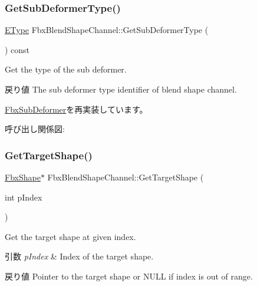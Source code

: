 \subsubsection{\texorpdfstring{Get\+Sub\+Deformer\+Type()}{GetSubDeformerType()}}
{\footnotesize\ttfamily \hyperlink{class_fbx_sub_deformer_aed7eba8aabbb8b25a8ddbab127d67319}{E\+Type} Fbx\+Blend\+Shape\+Channel\+::\+Get\+Sub\+Deformer\+Type (\begin{DoxyParamCaption}{ }\end{DoxyParamCaption}) const\hspace{0.3cm}{\ttfamily [virtual]}}

Get the type of the sub deformer. \begin{DoxyReturn}{戻り値}
The sub deformer type identifier of blend shape channel. 
\end{DoxyReturn}


\hyperlink{class_fbx_sub_deformer_a1a1998b98ca03598bc6bec630e1aaa97}{Fbx\+Sub\+Deformer}を再実装しています。

呼び出し関係図\+:
\mbox{\label{class_fbx_blend_shape_channel_a50cdc8d0c76e13c093453efca50484a6}} 
\subsubsection{\texorpdfstring{Get\+Target\+Shape()}{GetTargetShape()}\hspace{0.1cm}{\footnotesize\ttfamily [1/2]}}
{\footnotesize\ttfamily \hyperlink{class_fbx_shape}{Fbx\+Shape}$\ast$ Fbx\+Blend\+Shape\+Channel\+::\+Get\+Target\+Shape (\begin{DoxyParamCaption}\item[{int}]{p\+Index }\end{DoxyParamCaption})}

Get the target shape at given index. 
\begin{DoxyParams}{引数}
{\em p\+Index} & Index of the target shape. \\
\hline
\end{DoxyParams}
\begin{DoxyReturn}{戻り値}
Pointer to the target shape or {\ttfamily N\+U\+LL} if index is out of range. 
\end{DoxyReturn}
\mbox{\label{class_fbx_blend_shape_channel_ae91fea86db9ce91da637df78762b4fff}} 
